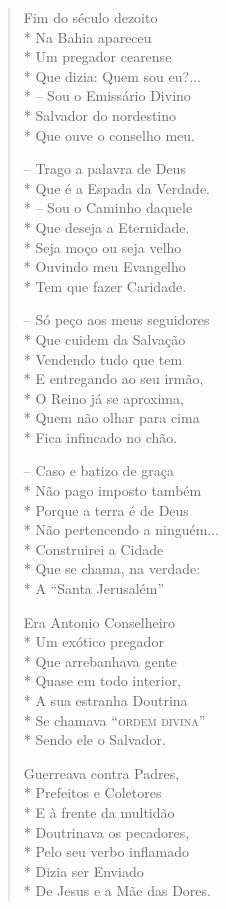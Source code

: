 \begin{verse}
Fim do século dezoito\\*
Na Bahia apareceu\\*
Um pregador cearense\\*
Que dizia: Quem sou eu?...\\*
-- Sou o Emissário Divino\\*
Salvador do nordestino\\*
Que ouve o conselho meu.

-- Trago a palavra de Deus\\*
Que é a Espada da Verdade.\\*
-- Sou o Caminho daquele\\*
Que deseja a Eternidade.\\*
Seja moço ou seja velho\\*
Ouvindo meu Evangelho\\*
Tem que fazer Caridade.

-- Só peço aos meus seguidores\\*
Que cuidem da Salvação\\*
Vendendo tudo que tem\\*
E entregando ao seu irmão,\\*
O Reino já se aproxima,\\*
Quem não olhar para cima\\*
Fica infincado no chão.

-- Caso e batizo de graça\\*
Não pago imposto também\\*
Porque a terra é de Deus\\*
Não pertencendo a ninguém...\\*
Construirei a Cidade\\*
Que se chama, na verdade:\\*
A ``Santa Jerusalém''

Era Antonio Conselheiro\\*
Um exótico pregador\\*
Que arrebanhava gente\\*
Quase em todo interior,\\*
A sua estranha Doutrina\\*
Se chamava ``\textsc{ordem divina}''\\*
Sendo ele o Salvador.

Guerreava contra Padres,\\*
Prefeitos e Coletores\\*
E à frente da multidão\\*
Doutrinava os pecadores,\\*
Pelo seu verbo inflamado\\*
Dizia ser Enviado\\*
De Jesus e a Mãe das Dores.


\end{verse}
